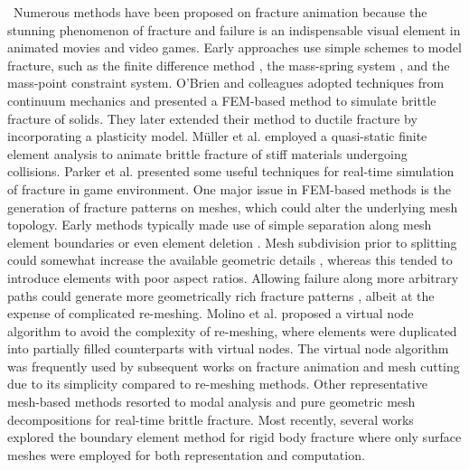 ~Numerous methods have been proposed on fracture animation \cite{muguercia2014fracture,Wu:2015:SPB:2858852.2858866} because the stunning phenomenon of fracture and failure is an indispensable visual element in animated movies and video games. Early approaches use simple schemes to model fracture, such as the finite difference method \cite{Terzopoulos:1988:MID:378456.378522}, the mass-spring system \cite{Norton:1991:AFP:115244.115248}, and the mass-point constraint system\cite{smith2001fast}. O'Brien and colleagues \cite{O'Brien:1999:GMA:311535.311550} adopted techniques from continuum mechanics and presented a FEM-based method to simulate brittle fracture of solids. They later extended their method to ductile fracture by incorporating a plasticity model\cite{O'Brien:2002:GMA:566654.566579}. M\"{u}ller et al. \cite{Muller2001} employed a quasi-static finite element analysis to animate brittle fracture of stiff materials undergoing collisions. Parker et al. \cite{Parker:2009:RDF:1599470.1599492} presented some useful techniques for real-time simulation of fracture in game environment. One major issue in FEM-based methods is the generation of fracture patterns on meshes, which could alter the underlying mesh topology. Early methods typically made use of simple separation along mesh element boundaries \cite{Norton:1991:AFP:115244.115248,Mazarak:1999:AEO:351631.351688,smith2001fast,Muller2001} or even element deletion \cite{forest2002removing}. Mesh subdivision prior to splitting could somewhat increase the available geometric details \cite{Mor:2000:MST:646923.710372,Bielser:2000:ISS:826029.826523}, whereas this tended to introduce elements with poor aspect ratios. Allowing failure along more arbitrary paths could generate more geometrically rich fracture patterns \cite{Neff:1999:VMB:351631.351686,O'Brien:1999:GMA:311535.311550,O'Brien:2002:GMA:566654.566579}, albeit at the expense of complicated re-meshing. Molino et al. \cite{Molino2004} proposed a virtual node algorithm to avoid the complexity of re-meshing, where elements were duplicated into partially filled counterparts with virtual nodes. The virtual node algorithm was frequently used by subsequent works on fracture animation \cite{Bao:2007:FRM:1263129.1263275} and mesh cutting \cite{Sifakis:2007:ACD:1272690.1272701,Wang:2015:AVN:2849517.2849531} due to its simplicity compared to re-meshing methods. Other representative mesh-based methods resorted to modal analysis \cite{glondu2013real} and pure geometric mesh decompositions \cite{Muller:2013:RTD:2461912.2461934,Schvartzman:2014:FAB:2556700.2556713} for real-time brittle fracture. Most recently, several works explored the boundary element method for rigid body fracture \cite{Zhu:2015:SRB:2809654.2766942,Hahn:2015:HBF:2809654.2766896} where only surface meshes were employed for both representation and computation.

